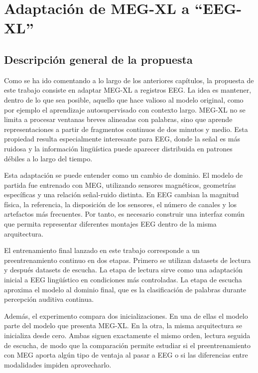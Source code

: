 \chapter{Adaptación de MEG-XL a ``EEG-XL''}
\providecommand{\codepath}[1]{\nolinkurl{#1}}

\section{Descripción general de la propuesta}

Como se ha ido comentando a lo largo de los anteriores capítulos, la propuesta de este trabajo consiste en adaptar MEG-XL a registros EEG. La idea es mantener, dentro de lo que sea posible, aquello que hace valioso al modelo original, como por ejemplo el aprendizaje autosupervisado con contexto largo. MEG-XL no se limita a procesar ventanas breves alineadas con palabras, sino que aprende representaciones a partir de fragmentos continuos de dos minutos y medio. Esta propiedad resulta especialmente interesante para EEG, donde la señal es más ruidosa y la información lingüística puede aparecer distribuida en patrones débiles a lo largo del tiempo.

Esta adaptación se puede entender como un cambio de dominio. El modelo de partida fue entrenado con MEG, utilizando sensores magnéticos, geometrías específicas y una relación señal-ruido distinta. En EEG cambian la magnitud física, la referencia, la disposición de los sensores, el número de canales y los artefactos más frecuentes. Por tanto, es necesario construir una interfaz común que permita representar diferentes montajes EEG dentro de la misma arquitectura.

El entrenamiento final lanzado en este trabajo corresponde a un preentrenamiento continuo en dos etapas. Primero se utilizan datasets de lectura y después datasets de escucha. La etapa de lectura sirve como una adaptación inicial a EEG lingüístico en condiciones más controladas. La etapa de escucha aproxima el modelo al dominio final, que es la clasificación de palabras durante percepción auditiva continua.

Además, el experimento compara dos inicializaciones. En una de ellas el modelo parte del modelo que presenta MEG-XL. En la otra, la misma arquitectura se inicializa desde cero. Ambas siguen exactamente el mismo orden, lectura seguida de escucha, de modo que la comparación permite estudiar si el preentrenamiento con MEG aporta algún tipo de ventaja al pasar a EEG o si las diferencias entre modalidades impiden aprovecharlo.

